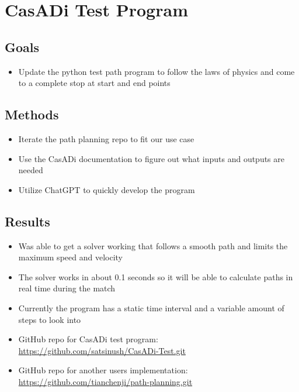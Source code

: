 \section{CasADi Test Program}

\subsection{Goals}
\begin{itemize}
    \item Update the python test path program to follow the laws of physics and come to a complete stop at start and end points
\end{itemize}

\subsection{Methods}
\begin{itemize}
    \item Iterate the path planning repo to fit our use case
    \item Use the CasADi documentation to figure out what inputs and outputs are needed
    \item Utilize ChatGPT to quickly develop the program
\end{itemize}

\subsection{Results}
\begin{itemize}
    \item Was able to get a solver working that follows a smooth path and limits the maximum speed and velocity
    \item The solver works in about 0.1 seconds so it will be able to calculate paths in real time during the match
    \item Currently the program has a static time interval and a variable amount of steps to look into
    \item GitHub repo for CasADi test program: \href{https://github.com/satsinush/CasADi-Test.git}{https://github.com/satsinush/CasADi-Test.git}
    \item GitHub repo for another users implementation: \href{https://github.com/tianchenji/path-planning.git}{https://github.com/tianchenji/path-planning.git}
\end{itemize}

